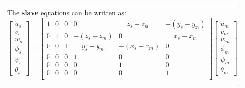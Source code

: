 \documentclass[10pt,b5paper,titlepage]{book}
\newenvironment{bbox}[1][0.96]
{
    \begin{center}
        \begin{tabular}{|p{#1\textwidth}|}
            \hline\\
}
{
            \\\\\hline
        \end{tabular}
    \end{center}
}
\begin{document}
\begin{bbox}[0.95]
    The \textbf{slave} equations can be written as:
    \begin{equation}
        \begin{bmatrix}
            u_s \\
            v_s \\
            w_s \\
            \phi_s \\
            \psi_s \\
            \theta_s
        \end{bmatrix}
        = \begin{bmatrix}
            1 & 0 & 0 & 0 & \phantom{-(}z_s - z_m & -(y_s - y_m) \\
            0 & 1 & 0 & -(z_s - z_m) & 0 & \phantom{-(}x_s - x_m \\
            0 & 0 & 1 & \phantom{-(}y_s - y_m & -(x_s - x_m) & 0 \\
            0 & 0 & 0 & 1 & 0 & 0 \\
            0 & 0 & 0 & 0 & 1 & 0 \\
            0 & 0 & 0 & 0 & 0 & 1 \\
        \end{bmatrix}
        \begin{bmatrix}
            u_m \\
            v_m \\
            w_m \\
            \phi_m \\
            \psi_m \\
            \theta_m
        \end{bmatrix}
    \end{equation}


\end{bbox}
\end{document}
